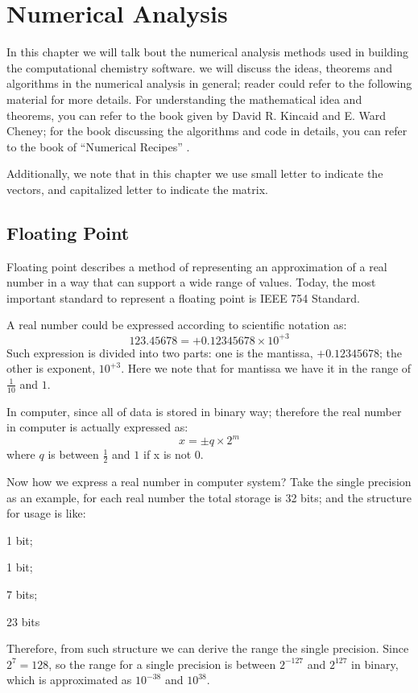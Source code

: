 %
%
%
\chapter{Numerical Analysis}
%
%
In this chapter we will talk bout the numerical analysis methods used in building 
the computational chemistry software. we will discuss the ideas,
theorems and algorithms in the numerical analysis in general; reader could refer
to the following material for more details. For understanding the mathematical 
idea and theorems, you can refer to the book given by David R. Kincaid and 
E. Ward Cheney\cite{Kincaid_2002_numerical_analysis}; for the book discussing the 
algorithms and code in details, you can refer to the book of ``Numerical Recipes''
\cite{numerical_recipes}.

Additionally, we note that in this chapter we use small letter to indicate the vectors,
and capitalized letter to indicate the matrix.

\section{Floating Point}

Floating point describes a method of representing an approximation 
of a real number in a way that can support a wide range of values.
Today, the most important standard to represent a floating point
is IEEE 754 Standard.

A real number could be expressed according to scientific notation as:
\begin{equation}
\label{Floating_Point_eq:1}
 123.45678 = +0.12345678\times 10^{+3}
\end{equation}
Such expression is divided into two parts: one is the mantissa,
$+0.12345678$; the other is exponent, $10^{+3}$. Here we note that
for mantissa we have it in the range of $\frac{1}{10}$ and $1$.

In computer, since all of data is stored in binary way; therefore
the real number in computer is actually expressed as:
\begin{equation}
\label{Floating_Point_eq:2}
 x = \pm q\times 2^{m}
\end{equation}
where $q$ is between $\frac{1}{2}$ and $1$ if x is not 0.

Now how we express a real number in computer system? Take the single
precision as an example, for each real number the total storage is 
32 bits; and the structure for usage is like:
\begin{description}
 \centering
 \item[Sign of mantessa] 1 bit;
 \item[Sign of exponent] 1 bit;
 \item[exponent($|m|$)]  7 bits;
 \item[mantissa($|q|$)]  23 bits
\end{description}
Therefore, from such structure we can derive the range the single precision.
Since $2^{7} = 128$,  so the range for a single precision is between $2^{-127}$ 
and $2^{127}$ in binary, which is approximated as $10^{-38}$ and $10^{38}$.

